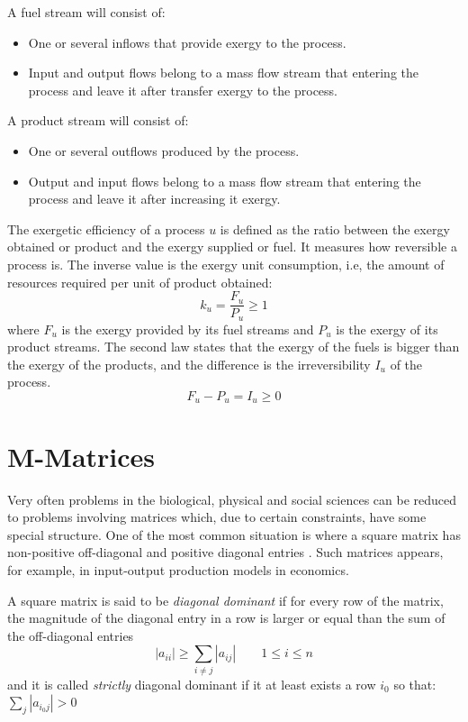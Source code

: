 \documentclass[preprint,12pt,times]{elsarticle}
\begin{document}
A fuel stream will consist of:
\begin{itemize}
	\item One or several inflows that provide exergy to the process.
	\item Input and output flows belong to a mass flow stream that entering the process and leave it after transfer exergy to the process.
\end{itemize}
A product stream will consist of:
\begin{itemize}
	\item One or several outflows produced by the process.
	\item Output and input flows belong to a mass flow stream that entering the process and leave it after increasing it exergy.
\end{itemize}

The exergetic efficiency of a process $u$ is defined as the ratio between the exergy obtained or product and the exergy supplied or fuel. It measures how reversible a process is. The inverse value is the exergy unit consumption, i.e, the amount of resources required per unit of product obtained:
\begin{equation}
k_u=\frac{F_u}{P_u} \ge 1
\end{equation}
where $F_u$ is the exergy provided by its fuel streams and $P_u$ is the exergy of its product streams. The second law states that the exergy of the fuels is bigger than the exergy of the products, and the difference is the irreversibility $I_u$ of the process.
\begin{equation}
\label{eq:fpi}
F_u - P_u = I_u \ge 0
\end{equation}

\appendix
\section{M-Matrices}
\label{A:1}
Very often problems in the biological, physical and social sciences can be reduced to problems involving matrices which, due to certain constraints, have some special structure. One of the most common situation is where a square matrix has non-positive off-diagonal and positive diagonal entries \cite{Smith:2012qr}. Such matrices appears, for example, in input-output production models in economics.

A square matrix  is said to be \emph{diagonal dominant} if for every row of the matrix, the magnitude of the diagonal entry in a row is larger or equal than the sum of the off-diagonal entries
\[ \left|a_{ii}\right| \geq \sum_{i \neq j} {\left|a_{ij}\right|}
\qquad 1 \leq i \leq n \]
and it is called \emph{strictly} diagonal dominant if it at least exists a row $i_0$
so that: $\sum_{j}{\left| a_{i_0 j} \right|} > 0$
\end{document}
